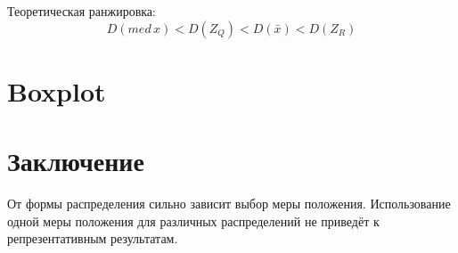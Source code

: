 \documentclass{article} %
\begin{document}
Теоретическая ранжировка:
\[ D(med \, x) < D(Z_Q) < D(\bar{x}) < D(Z_R) \]

\section{Boxplot}


\section{Заключение}
От формы распределения сильно зависит выбор меры положения. Использование одной меры положения для различных распределений не приведёт к репрезентативным результатам.
\end{document}
